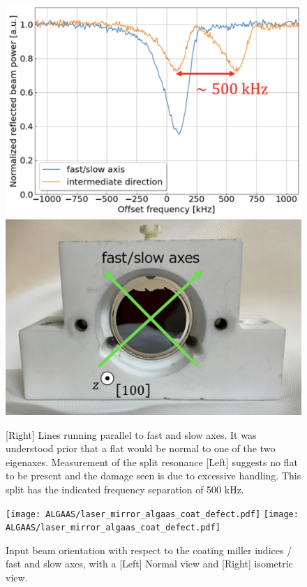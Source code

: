 \begin{figure}[!ht]
    \begin{subcaptiongroup}
	    \includegraphics[width=.485\textwidth]{figs/ALGAAS/split_resonance.png}
	    \label{splitresonance}
	    \includegraphics[width=.52\textwidth]{figs/ALGAAS/fas_axes.png}
	    \label{fasaxes}
    \end{subcaptiongroup}
    \caption{[Right] Lines running parallel to fast and slow axes. It was understood prior that a flat would be normal to one of the two eigenaxes. Measurement of the split resonance [Left] suggests no flat to be present and the damage seen is due to excessive handling. This split has the indicated frequency separation of 500 kHz.}
    \label{fig:split_cav_resonance}
\end{figure}

\begin{figure}[!h]
    \centering
    \begin{subcaptiongroup}
	    \texttt{[image: ALGAAS/laser\_mirror\_algaas\_coat\_defect.pdf]}
	    \label{conormaldefect}
	    \texttt{[image: ALGAAS/laser\_mirror\_algaas\_coat\_defect.pdf]}
	    \label{coisodefect}
    \end{subcaptiongroup}
    \caption{Input beam orientation with respect to the coating miller indices / fast and slow axes, with a [Left] Normal view and [Right] isometric view.}
\end{figure}


